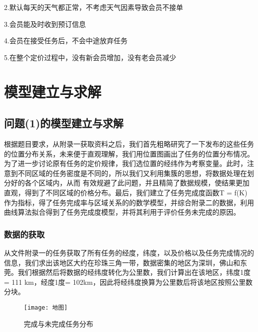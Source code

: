 \documentclass{ctexart}
\begin{document}
2.默认每天的天气都正常，不考虑天气因素导致会员不接单

3.会员能及时收到预订信息

4.会员在接受任务后，不会中途放弃任务

5.在整个定价过程中，没有新会员增加，没有老会员减少



\section{模型建立与求解}
\subsection{问题(1)的模型建立与求解}
根据题目要求，从附录一获取资料之后，我们首先粗略研究了一下发布的这些任务的位置分布关系，未来便于直观理解，我们用位置图画出了任务的位置分布情况。为了进一步讨论原有任务的定价规律，我们选位置的经纬作为考察变量。此时，注意到不同区域的任务密度是不同的，所以我们又利用集簇的思想，将数据处理在划分好的各个区域内，从而 有效规避了此问题，并且精简了数据规模，使结果更加直观，得到了不同区域的价格分布。最后，我们建立了任务完成度函数T = f(K)作为指标，得了任务完成率与区域关系的的数学模型，并综合附录二的数据，利用曲线算法拟合得到了任务完成度模型，并将其利用于评价任务未完成的原因。
\subsubsection{数据的获取}
从文件附录一的任务获取了所有任务的经度，纬度，以及价格以及任务完成情况的信息，我们求出该地区大约在珍珠三角一带，数据密集的地区为深圳，佛山和东莞。我们根据然后将数据的经纬度转化为公里数，我们计算出在该地区，纬度1度= 111 km，经度1度= 102km，因此将经纬度换算为公里数后将该地区按照公里数分块。
\begin{figure}[htbp] 
\centering
\texttt{[image: 地图]} 
\caption{完成与未完成任务分布}
\end{figure}
\newpage
\end{document}
